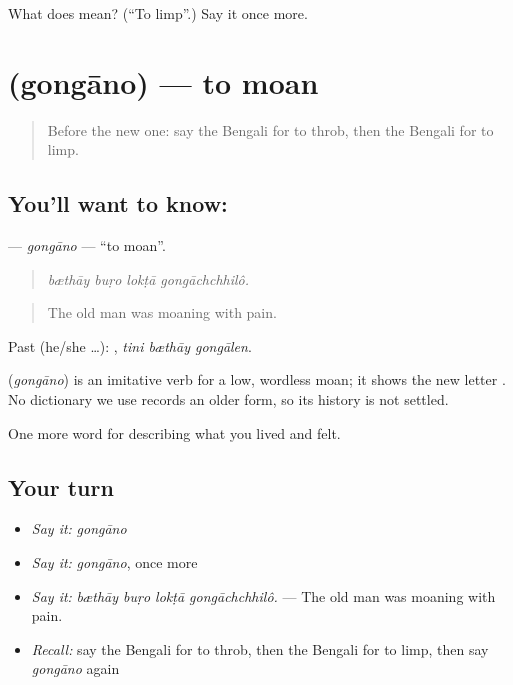 \begin{tcolorbox}[breakable,colback=teal!4,colframe=teal!35!black,title={Before you move on}]
What does  mean? (\textquotedblleft{}To limp\textquotedblright{}.) Say it once more.
\end{tcolorbox}
\section[\texorpdfstring{\bn{গোঙানো} (gongāno)}{গোঙানো (gongāno)}]{ (gongāno) — to moan}

\label{lesson:BN-C477-gongano}



\begin{quote}
Before the new one: say the Bengali for to throb, then the Bengali for to limp.
\end{quote}

\subsection*{You'll want to know: }
\textbf{} — \emph{gongāno} — \textquotedblleft{}to moan\textquotedblright{}.

\begin{quote}
   
\end{quote}

\begin{quote}
\emph{bæthāy buṛo lokṭā gongāchchhilô.}
\end{quote}

\begin{quote}
The old man was moaning with pain.
\end{quote}

Past (he/she …):   , \emph{tini bæthāy gongālen}.

\begin{cousinweb}
\textbf{} (\emph{gongāno}) is an imitative verb for a low, wordless moan; it shows the new letter . No dictionary we use records an older form, so its history is not settled.
\end{cousinweb}

\begin{grammarlens}[title={What you've built}]
One more word for describing what you lived and felt.
\end{grammarlens}

\subsection*{Your turn}
\begin{itemize}
\raggedright
  \item \emph{Say it:} \emph{gongāno}
  \item \emph{Say it:} \emph{gongāno}, once more
  \item \emph{Say it:} \emph{bæthāy buṛo lokṭā gongāchchhilô.} — The old man was moaning with pain.
  \item \emph{Recall:} say the Bengali for to throb, then the Bengali for to limp, then say \emph{gongāno} again
\end{itemize}

